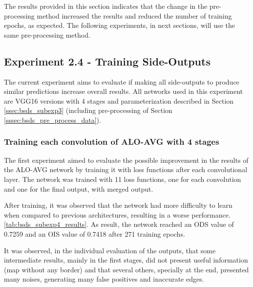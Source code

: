 The results provided in this section indicates that the change in the pre-processing method increased the results and reduced the number of training epochs, as expected.
The following experiments, in next sections, will use the same pre-processing method.
  
\subsection{Experiment 2.4 - Training Side-Outputs}
\label{ssec:bsds_subexp4}

{\color{red}
The current experiment aims to evaluate if making all side-outputs to produce similar predictions increase overall results.
All networks used in this experiment are VGG16 versions with 4 stages and parameterization described in Section \ref{ssec:bsds_subexp3} (including  pre-processing of Section \ref{sssec:bsds_pre_process_data}).
}

\subsubsection{Training each convolution of ALO-AVG with 4 stages}
\label{sssec:train_conv_alo_avg}

The first experiment aimed to evaluate the possible improvement in the results of the ALO-AVG network by training it with loss functions after each convolutional layer.
The network was trained with 11 loss functions, one for each convolution and one for the final output, with merged output.


After training, it was observed that the network had more difficulty to learn when compared to previous architectures, resulting in a worse performance. \ref{tab:bsds_subexp4_results}.
As result, the network reached an ODS value of 0.7259 and an OIS value of 0.7418 after 271 training epochs.

It was observed, in the individual evaluation of the outputs, that some intermediate results, mainly in the first stages, did not present useful information (map without any border) and that several others, specially at the end, presented many noises, generating many false positives and inaccurate edges.

